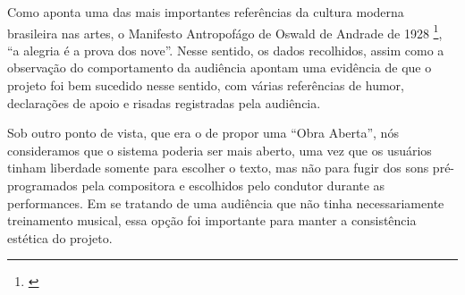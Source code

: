 Como aponta uma das mais importantes referências da cultura moderna brasileira nas artes, o Manifesto Antropofágo de Oswald de Andrade de 1928 \footnote{\cite{Andrade1928}}, ``a alegria é a prova dos nove''. Nesse sentido, os dados recolhidos, assim como a observação do comportamento da audiência apontam uma evidência de que o projeto foi bem sucedido nesse sentido, com várias referências de humor, declarações de apoio e risadas registradas pela audiência. 


Sob outro ponto de vista, que era o de propor uma ``Obra Aberta'', nós consideramos que o sistema poderia ser mais aberto, uma vez que os usuários tinham liberdade somente para escolher o texto, mas não para fugir dos sons pré-programados pela compositora e escolhidos pelo condutor durante as performances. Em se tratando de uma audiência que não tinha necessariamente treinamento musical, essa opção foi importante para manter a consistência estética do projeto.






